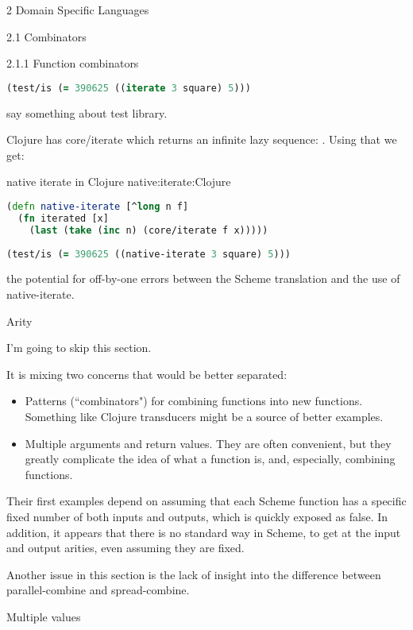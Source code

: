 \documentclass[12pt]{PalisadesLakesBook}
\begin{document}
\begin{plSection}{}
\begin{plSection}{2 Domain Specific Languages}
\begin{plSection}{2.1 Combinators}
\begin{plSection}{2.1.1 Function combinators}
\begin{plListing}
\begin{lstlisting}[language=clojure]
(test/is (= 390625 ((iterate 3 square) 5)))
\end{lstlisting}
\end{plListing}
\TODO say something about {\clojureFont test} library.

Clojure has {\clojureFont core/iterate} 
which returns an infinite lazy sequence:
{\clojureFont [(f x) (f (f x)) \ldots]}.
Using that we get:
\begin{plListing}
{native {\clojureFont iterate} in Clojure}
{native:iterate:Clojure}
\begin{lstlisting}[language=clojure]
(defn native-iterate [^long n f]
  (fn iterated [x] 
    (last (take (inc n) (core/iterate f x)))))
    
(test/is (= 390625 ((native-iterate 3 square) 5)))
\end{lstlisting}
\end{plListing}
\NOTE the potential for off-by-one errors between the Scheme
translation and the use of {\clojureFont native-iterate}.

\begin{plSection}{Arity}

I'm going to skip this section.

It is mixing two concerns that would be better separated:
\begin{itemize}
  \item Patterns (``combinators")
  for combining functions into new functions.
  Something like Clojure transducers might be a source of 
  better examples.
  \item Multiple arguments and return values. 
  They are often convenient, but they greatly complicate 
  the idea of what a function is, and, especially,
  combining functions.
  
\end{itemize}
Their first examples depend on assuming that each Scheme function
has a specific fixed number of both inputs and outputs, 
which is quickly exposed as false. 
In addition, it appears that there is no standard way 
in Scheme,
to get at the input and output arities, even assuming they are 
fixed.

Another issue in this section is the lack of insight
into the difference between {\schemeFont parallel-combine}
and {\schemeFont spread-combine}. 

\end{plSection}%
\begin{plSection}{Multiple values}\label{Multiple:values}


\end{plSection}
\end{plSection}
\end{plSection}
\end{plSection}
\end{plSection}
\end{document}
